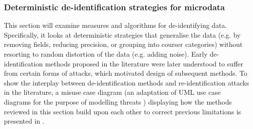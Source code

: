 
\subsubsection{Deterministic de-identification strategies for microdata}

This section will examine measures and algorithms for de-identifying data. Specifically, it looks at deterministic strategies that generalise the data (e.g. by removing fields, reducing precision, or grouping into courser categories) without resorting to random distortion of the data (e.g. adding noise). Early de-identification methods proposed in the literature were later understood to suffer from certain forms of attacks, which motivated design of subsequent methods. To show the interplay between de-identification methods and re-identification attacks in the literature, a misuse case diagram (an adaptation of UML use case diagrams for the purpose of modelling threats \cite{Alexander2003}) displaying how the methods reviewed in this section build upon each other to correct previous limitations is presented in .

